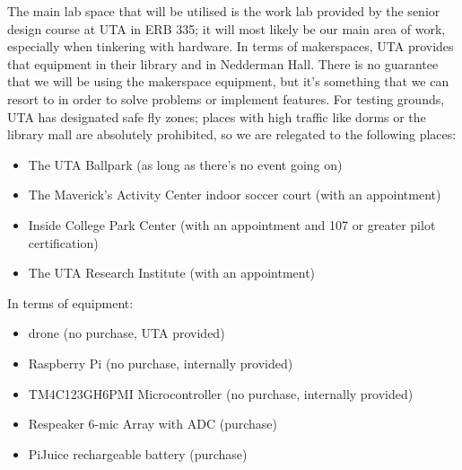 The main lab space that will be utilised is the work lab provided by the senior design course at UTA in ERB 335; it will most likely be our main area of work, especially when tinkering with hardware. In terms of makerspaces, UTA provides that equipment in their library and in Nedderman Hall.  There is no guarantee that we will be using the makerspace equipment, but it's something that we can resort to in order to solve problems or implement features. For testing grounds, UTA has designated safe fly zones; places with high traffic like dorms or the library mall are absolutely prohibited, so we are relegated to the following places:  
\begin{itemize}
    \item The UTA Ballpark (as long as there's no event going on)
    \item The Maverick's Activity Center indoor soccer court (with an appointment)
    \item Inside College Park Center (with an appointment and 107 or greater pilot certification)
    \item The UTA Research Institute (with an appointment)
\end{itemize}
In terms of equipment:
\begin{itemize}
    \item drone (no purchase, UTA provided)
    \item Raspberry Pi (no purchase, internally provided)
    \item TM4C123GH6PMI Microcontroller (no purchase, internally provided)
    \item Respeaker 6-mic Array with ADC (purchase)
    \item PiJuice rechargeable battery (purchase)
\end{itemize}